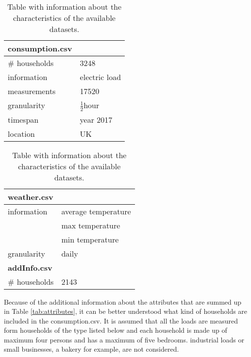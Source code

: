 
\begin{table}
	\footnotesize
	\hspace{1cm}
	\begin{tabular}[t]{@{}ll}\hline
		\textbf{consumption.csv}&\\ \hline
		\# households &3248 \\ 
		information & electric load\\
		measurements & 17520\\
		granularity&$ \frac{1}{2} $hour\\ 
		timespan&year 2017 \\    
		location&UK\\ \bottomrule   
	\end{tabular}
	\hspace{2cm}
	\begin{tabular}[t]{@{}ll}\hline
		\textbf{weather.csv}&\\ \hline
		information & average temperature\\
		& max temperature\\
		& min temperature\\
		granularity& daily\\ \hline \hline
		\textbf{addInfo.csv}&\\ \hline
		\# households &2143 \\ \bottomrule		    
	\end{tabular}
	\hfill
	\caption{Table with information about the characteristics of the available datasets.}
\end{table}

Because of the additional information about the attributes that are summed up in Table \ref{tab:attributes}, it can be better understood what kind of households are included in the consumption.csv. It is assumed that all the loads are measured form households of the type listed below and each household is made up of maximum four persons and has a maximum of five bedrooms. industrial loads or small businesses, a bakery for example, are not considered.

